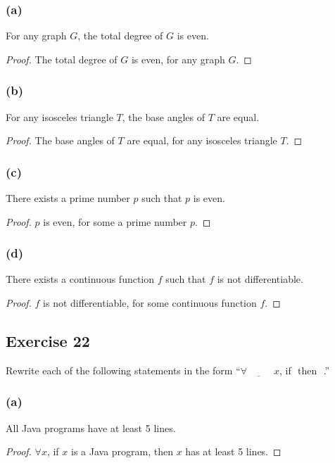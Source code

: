 \documentclass[14pt]{extarticle}
\newcommand{\fbl}{\underline{\hspace{1cm}}\,\,}
\newcommand{\fa}{\forall}
\begin{document}
\subsubsection{(a)}
For any graph $G$, the total degree of $G$ is even.

\begin{proof}
The total degree of $G$ is even, for any graph $G$.
\end{proof}

\subsubsection{(b)}
For any isosceles triangle $T$, the base angles of $T$ are equal.

\begin{proof}
The base angles of $T$ are equal, for any isosceles triangle $T$.
\end{proof}

\subsubsection{(c)}
There exists a prime number $p$ such that $p$ is even.

\begin{proof}
$p$ is even, for some a prime number $p$.
\end{proof}

\subsubsection{(d)}
There exists a continuous function $f$ such that $f$ is not differentiable.

\begin{proof}
$f$ is not differentiable, for some continuous function $f$.
\end{proof}

\subsection{Exercise 22}
Rewrite each of the following statements in the form “$\fa \fbl x$, if \fbl then \fbl.”

\subsubsection{(a)}
All Java programs have at least 5 lines.

\begin{proof}
$\fa x$, if $x$ is a Java program, then $x$ has at least 5 lines.
\end{proof}
\end{document}
